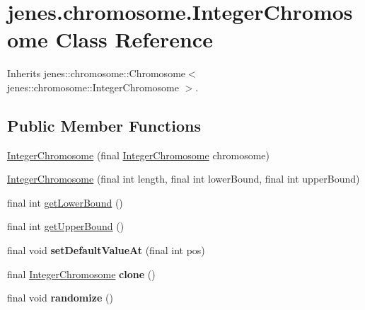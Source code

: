 \hypertarget{classjenes_1_1chromosome_1_1_integer_chromosome}{
\section{jenes.chromosome.IntegerChromosome Class Reference}
\label{classjenes_1_1chromosome_1_1_integer_chromosome}
}
Inherits jenes::chromosome::Chromosome$<$ jenes::chromosome::IntegerChromosome $>$.

\subsection*{Public Member Functions}
\begin{CompactItemize}
\item 
\hyperlink{classjenes_1_1chromosome_1_1_integer_chromosome_10f477c2c6fb3893a0fc331a933e5b39}{IntegerChromosome} (final \hyperlink{classjenes_1_1chromosome_1_1_integer_chromosome}{IntegerChromosome} chromosome)
\item 
\hyperlink{classjenes_1_1chromosome_1_1_integer_chromosome_44849b4866ead257aacae333ad7737bd}{IntegerChromosome} (final int length, final int lowerBound, final int upperBound)
\item 
final int \hyperlink{classjenes_1_1chromosome_1_1_integer_chromosome_e3932d5f359d42a6fb783f9254e870b7}{getLowerBound} ()
\item 
final int \hyperlink{classjenes_1_1chromosome_1_1_integer_chromosome_f5a9d680853b67fd2ad8fc96853957d5}{getUpperBound} ()
\item 
\hypertarget{classjenes_1_1chromosome_1_1_integer_chromosome_fa0e3d50dbda7f0c84f8558776543d7c}{
final void \textbf{setDefaultValueAt} (final int pos)}
\label{classjenes_1_1chromosome_1_1_integer_chromosome_fa0e3d50dbda7f0c84f8558776543d7c}

\item 
\hypertarget{classjenes_1_1chromosome_1_1_integer_chromosome_9189b20273989ee1e83aa21ca11a982d}{
final \hyperlink{classjenes_1_1chromosome_1_1_integer_chromosome}{IntegerChromosome} \textbf{clone} ()}
\label{classjenes_1_1chromosome_1_1_integer_chromosome_9189b20273989ee1e83aa21ca11a982d}

\item 
\hypertarget{classjenes_1_1chromosome_1_1_integer_chromosome_8474f73dce296ea5625dc9edb235cd47}{
final void \textbf{randomize} ()}
\label{classjenes_1_1chromosome_1_1_integer_chromosome_8474f73dce296ea5625dc9edb235cd47}


\end{CompactItemize}
